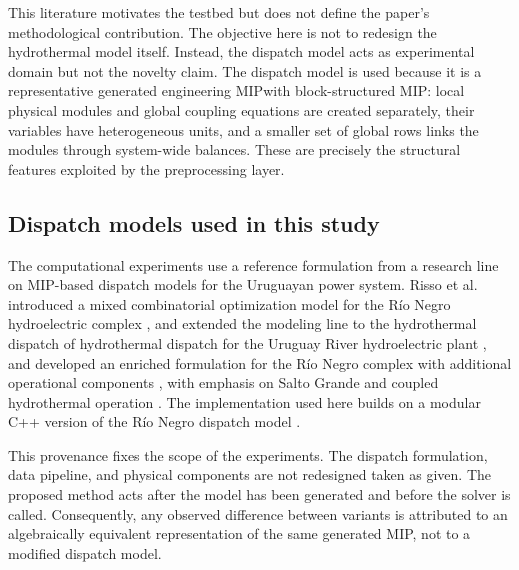 \documentclass[AMA,Times1COL]{WileyNJDv5} %
\providecommand{\DIFadd}[1]{{\protect\color{blue} \sf #1}} %
\providecommand{\DIFdel}[1]{{\protect\color{red} \scriptsize #1}} %
\providecommand{\DIFaddbegin}{} %
\providecommand{\DIFaddend}{} %
\providecommand{\DIFdelbegin}{} %
\providecommand{\DIFdelend}{} %
\begin{document}
This literature motivates the \DIFdelbegin \DIFdel{testbed but does not define the paper's methodological contribution. The objective here is not to redesign the hydrothermal model itself. Instead, the dispatch model acts as }\DIFdelend \DIFaddbegin \DIFadd{experimental domain but not the novelty claim. The dispatch model is used because it is }\DIFaddend a representative generated \DIFdelbegin \DIFdel{engineering MIPwith }\DIFdelend \DIFaddbegin \DIFadd{block-structured MIP: }\DIFaddend local physical modules \DIFdelbegin \DIFdel{and global coupling equations}\DIFdelend \DIFaddbegin \DIFadd{are created separately, their variables have heterogeneous units, and a smaller set of global rows links the modules through system-wide balances. These are precisely the structural features exploited by the preprocessing layer}\DIFaddend .

\subsection{Dispatch models used in this study}

The computational experiments use a reference formulation from a research line on
MIP-based dispatch models for the Uruguayan power system. Risso et al. introduced a mixed combinatorial optimization model for the
R\'io Negro hydroelectric complex \DIFdelbegin \DIFdel{\citep{risso2025rioNegro}, }\DIFdelend \DIFaddbegin \DIFadd{\cite{risso2025rioNegro} and }\DIFaddend extended the
modeling line to \DIFdelbegin \DIFdel{the hydrothermal dispatch of
}\DIFdelend \DIFaddbegin \DIFadd{hydrothermal dispatch for }\DIFaddend the Uruguay River hydroelectric plant\DIFdelbegin \DIFdel{\citep{risso2025uruguayRiver},
and developed an
enriched formulation for the R\'io Negro complex with additional operational components
\citep{risso2026enriched}}\DIFdelend \DIFaddbegin \DIFadd{,
with emphasis on Salto Grande and coupled hydrothermal operation
\cite{risso2025uruguayRiver}}\DIFaddend . The implementation used here builds on a modular
C++ version of the R\'io Negro dispatch model \DIFdelbegin \DIFdel{\citep{rodriguez2025thesis}}\DIFdelend \DIFaddbegin \DIFadd{\cite{rodriguez2025thesis}}\DIFaddend .

This provenance fixes the scope of the experiments. The dispatch formulation, data
pipeline, and physical components are \DIFdelbegin \DIFdel{not redesigned}\DIFdelend \DIFaddbegin \DIFadd{taken as given}\DIFaddend . The proposed method acts after the
model has been generated and before the solver is called. \DIFaddbegin \DIFadd{Consequently, any observed
difference between variants is attributed to an algebraically equivalent representation of
the same generated MIP, not to a modified dispatch model.
}\DIFaddend 
\end{document}
